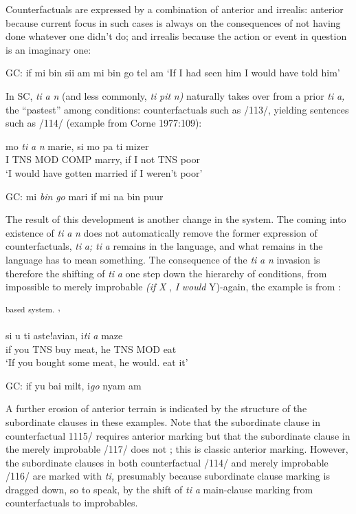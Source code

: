 Counterfactuals are expressed by a combination of anterior and irrealis: anterior because current focus in such cases is always on the conse\-quences of not having done whatever one didn't do; and irrealis because the action or event in question is an imaginary one:

\ea\label{ex:2:113}
 GC: if mi bin sii am mi bin go tel am
\glt `If I had seen him I would have told him'
\z



In SC, \textit{ti} \textit{a} \textit{n} (and less commonly, \textit{ti} \textit{pit} \textit{n}\textit{)} naturally takes over from a prior \textit{ti} \textit{a,} the ``pastest'' among conditions: counterfactuals such
as /113/, yielding sentences such as /114/ (example from Corne 1977:109):

\ea\label{ex:2:114}
\gll mo \textit{ti} \textit{a} \textit{n} marie, si mo pa ti mizer\\
I TNS MOD COMP marry, if I not TNS poor\\
\glt `I would have gotten married if I weren't poor' 
\z


\ea\label{ex:2:115}
GC: mi \textit{bin} \textit{go} mari if mi na bin puur
\z

The result of this development is another change in the system. The coming into existence of \textit{ti} \textit{a} \textit{n} does not automatically remove the former expression of counterfactuals, \textit{ti} \textit{a;} \textit{ti} \textit{a} remains in the lan\-guage, and what remains in the language has to mean something. The consequence of the \textit{ti} \textit{a} \textit{n} invasion is therefore the shifting of \textit{ti} \textit{a} one step down the hierarchy of conditions, from impossible to merely
improbable \textit{(}\textit{i}\textit{f} \textit{X} , \textit{I} \textit{would} Y){}-again, the example is from \citet[106]{Corne1977}:

\textsuperscript{based} \textsuperscript{system. }'

\ea\label{ex:2:116}
\gll si u ti aste!avian, i\textit{ti} \textit{a} maze\\
if you TNS buy meat, he TNS MOD eat\\
\glt `If you bought some meat, he would. eat it'
\z

\ea\label{ex:2:117}
GC: if yu bai milt, i\textit{go} nyam am
\z

A further erosion of anterior terrain is indicated by the structure of the subordinate clauses in these examples. Note that the subordinate clause in counterfactual 1115/ requires anterior marking but that the subordinate clause in the merely improbable /117/ does not ; this is classic anterior marking. However, the subordinate clauses in both counterfactual /114/ and merely improbable /116/ are marked with \textit{ti,} presumably because subordinate clause marking is dragged down, so to speak, by the shift of \textit{ti} \textit{a} main-clause marking from counterfactuals
to improbables.

